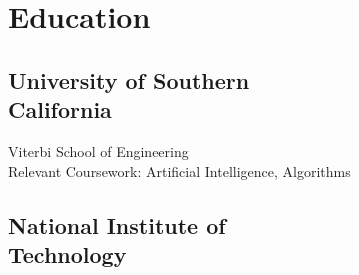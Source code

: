 \documentclass[]{deedy-resume-openfont}
\begin{document}
\begin{minipage}[t]{0.33\textwidth} 


\section{Education} 

\subsection[University of Southern California]{University of Southern\\ California}
Viterbi School of Engineering \\
Relevant Coursework: Artificial Intelligence, Algorithms
\sectionsep

\subsection[National Institute of Technology]{National Institute of \\ Technology}
\sectionsep


%
%
%


\end{minipage}
\end{document}
